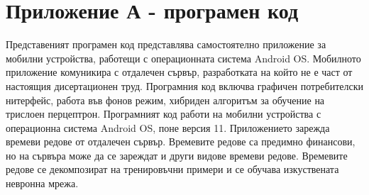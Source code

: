 \chapter*{Приложение А - програмен код}

Представеният програмен код представлява самостоятелно приложение за мобилни устройства, работещи с операционната система Android OS. Мобилното приложение комуникира с отдалечен сървър, разработката на който не е част от настоящия дисертационен труд. Програмния код включва графичен потребителски нитерфейс, работа във фонов режим, хибриден алгоритъм за обучение на трислоен перцептрон. Програмният код работи на мобилни устройства с операционна система Android OS, поне версия 11. Приложението зарежда времеви редове от отдалечен сървър. Времевите редове са предимно финансови, но на сървъра може да се зареждат и други видове времеви редове. Времевите редове се декомпозират на тренировъчни примери и се обучава изкуствената невронна мрежа. 

\vspace*{5mm}

